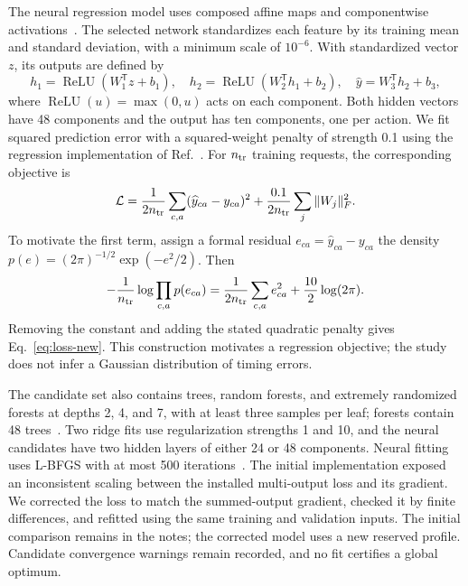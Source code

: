 The neural regression model uses composed affine maps and componentwise activations~\cite{Pedregosa2011Bounds}. The selected network standardizes each feature by its training mean and standard deviation, with a minimum scale of $10^{-6}$. With standardized vector $z$, its outputs are defined by
\begin{equation}
 h_1=\operatorname{ReLU}(W_1^{\mathsf T}z+b_1),\quad
 h_2=\operatorname{ReLU}(W_2^{\mathsf T}h_1+b_2),\quad
 \widehat y=W_3^{\mathsf T}h_2+b_3,
 \label{eq:network-new}
\end{equation}
where $\operatorname{ReLU}(u)=\max(0,u)$ acts on each component. Both hidden vectors have 48 components and the output has ten components, one per action. We fit squared prediction error with a squared-weight penalty of strength 0.1 using the regression implementation of Ref.~\cite{Pedregosa2011Bounds}. For $n_{\rm tr}$ training requests, the corresponding objective is
\begin{equation}
 \mathcal L=\frac{1}{2n_{\rm tr}}\sum_{c,a}
 (\widehat y_{ca}-y_{ca})^2+
 \frac{0.1}{2n_{\rm tr}}\sum_j\|W_j\|_F^2.
 \label{eq:loss-new}
\end{equation}
To motivate the first term, assign a formal residual $e_{ca}=\widehat y_{ca}-y_{ca}$ the density $p(e)=(2\pi)^{-1/2}\exp(-e^2/2)$. Then
\begin{equation*}
 -\frac{1}{n_{\rm tr}}\log\prod_{c,a}p(e_{ca})
 =\frac{1}{2n_{\rm tr}}\sum_{c,a}e_{ca}^2+\frac{10}{2}\log(2\pi).
\end{equation*}
Removing the constant and adding the stated quadratic penalty gives Eq.~\eqref{eq:loss-new}. This construction motivates a regression objective; the study does not infer a Gaussian distribution of timing errors.

The candidate set also contains trees, random forests, and extremely randomized forests at depths 2, 4, and 7, with at least three samples per leaf; forests contain 48 trees~\cite{CART1984,Breiman2001Forest,Geurts2006ExtraTrees}. Two ridge fits use regularization strengths 1 and 10, and the neural candidates have two hidden layers of either 24 or 48 components. Neural fitting uses L-BFGS with at most 500 iterations~\cite{Pedregosa2011Bounds}. The initial implementation exposed an inconsistent scaling between the installed multi-output loss and its gradient. We corrected the loss to match the summed-output gradient, checked it by finite differences, and refitted using the same training and validation inputs. The initial comparison remains in the notes; the corrected model uses a new reserved profile. Candidate convergence warnings remain recorded, and no fit certifies a global optimum.

